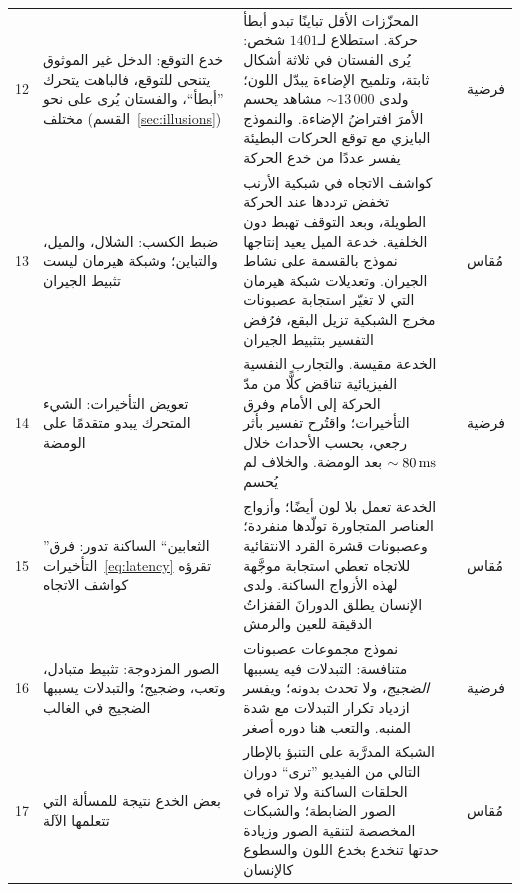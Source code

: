 {\begin{longtable}{>{\raggedright}p{0.5cm}>{\raggedright}p{4.0cm}>{\raggedright}p{5.6cm}>{\raggedright}p{2.3cm}>{\raggedright\arraybackslash}p{1.7cm}}
12 & خدع التوقع: الدخل غير الموثوق يتنحى للتوقع، فالباهت يتحرك ”أبطأ“، والفستان يُرى على نحو مختلف (القسم~\ref{sec:illusions}) & المحزّزات الأقل تباينًا تبدو أبطأ حركة. استطلاع لـ$1401$ شخص: يُرى الفستان في ثلاثة أشكال ثابتة، وتلميح الإضاءة يبدّل اللون؛ ولدى $\sim13\,000$ مشاهد يحسم الأمرَ افتراضُ الإضاءة. والنموذج البايزي مع توقع الحركات البطيئة يفسر عددًا من خدع الحركة & \cite{Thompson1982,LaferSousa2015,Wallisch2017,Weiss2002,Purves2011} & فرضية \\
13 & ضبط الكسب: الشلال، والميل، والتباين؛ وشبكة هيرمان ليست تثبيط الجيران & كواشف الاتجاه في شبكية الأرنب تخفض ترددها عند الحركة الطويلة، وبعد التوقف تهبط دون الخلفية. خدعة الميل يعيد إنتاجها نموذج بالقسمة على نشاط الجيران. وتعديلات شبكة هيرمان التي لا تغيّر استجابة عصبونات مخرج الشبكية تزيل البقع، فرُفض التفسير بتثبيط الجيران & \cite{BarlowHill1963,Schwartz2009,SchillerCarvey2005} & مُقاس \\
14 & تعويض التأخيرات: الشيء المتحرك يبدو متقدمًا على الومضة & الخدعة مقيسة. والتجارب النفسية الفيزيائية تناقض كلًّا من مدّ الحركة إلى الأمام وفرق التأخيرات؛ واقتُرح تفسير بأثر رجعي، بحسب الأحداث خلال $\sim80\,\text{ms}$ بعد الومضة. والخلاف لم يُحسم & \cite{Nijhawan1994,EaglemanSejnowski2000} & فرضية \\
15 & ”الثعابين“ الساكنة تدور: فرق التأخيرات~\eqref{eq:latency} تقرؤه كواشف الاتجاه & الخدعة تعمل بلا لون أيضًا؛ وأزواج العناصر المتجاورة تولّدها منفردة؛ وعصبونات قشرة القرد الانتقائية للاتجاه تعطي استجابة موجَّهة لهذه الأزواج الساكنة. ولدى الإنسان يطلق الدورانَ القفزاتُ الدقيقة للعين والرمش & \cite{Conway2005,OteroMillan2012} & مُقاس \\
16 & الصور المزدوجة: تثبيط متبادل، وتعب، وضجيج؛ والتبدلات يسببها الضجيج في الغالب & نموذج مجموعات عصبونات متنافسة: التبدلات فيه يسببها \emph{الضجيج}، ولا تحدث بدونه؛ ويفسر ازدياد تكرار التبدلات مع شدة المنبه. والتعب هنا دوره أصغر & \cite{MorenoBote2007} & فرضية \\
17 & بعض الخدع نتيجة للمسألة التي تتعلمها الآلة & الشبكة المدرَّبة على التنبؤ بالإطار التالي من الفيديو ”ترى“ دوران الحلقات الساكنة ولا تراه في الصور الضابطة؛ والشبكات المخصصة لتنقية الصور وزيادة حدتها تنخدع بخدع اللون والسطوع كالإنسان & \cite{Watanabe2018,GomezVilla2020} & مُقاس \\
\bottomrule
\end{longtable}}
